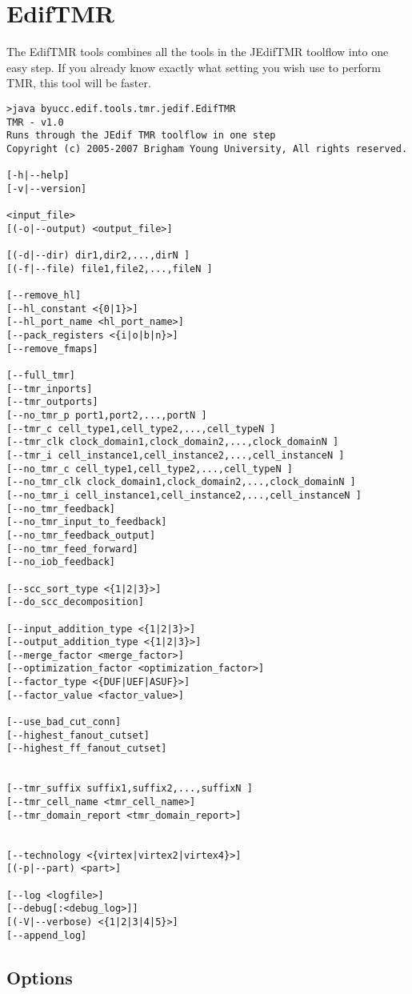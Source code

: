 \section{EdifTMR}
The EdifTMR tools combines all the tools in the JEdifTMR toolflow into
one easy step. If you already know exactly what setting you wish use
to perform TMR, this tool will be faster.

\begin{verbatim}
>java byucc.edif.tools.tmr.jedif.EdifTMR
TMR - v1.0 
Runs through the JEdif TMR toolflow in one step
Copyright (c) 2005-2007 Brigham Young University, All rights reserved.

[-h|--help]
[-v|--version]

<input_file> 
[(-o|--output) <output_file>]

[(-d|--dir) dir1,dir2,...,dirN ]
[(-f|--file) file1,file2,...,fileN ]

[--remove_hl]
[--hl_constant <{0|1}>]
[--hl_port_name <hl_port_name>]
[--pack_registers <{i|o|b|n}>]
[--remove_fmaps]

[--full_tmr]
[--tmr_inports]
[--tmr_outports]
[--no_tmr_p port1,port2,...,portN ]
[--tmr_c cell_type1,cell_type2,...,cell_typeN ]
[--tmr_clk clock_domain1,clock_domain2,...,clock_domainN ]
[--tmr_i cell_instance1,cell_instance2,...,cell_instanceN ]
[--no_tmr_c cell_type1,cell_type2,...,cell_typeN ]
[--no_tmr_clk clock_domain1,clock_domain2,...,clock_domainN ]
[--no_tmr_i cell_instance1,cell_instance2,...,cell_instanceN ]
[--no_tmr_feedback]
[--no_tmr_input_to_feedback]
[--no_tmr_feedback_output]
[--no_tmr_feed_forward]
[--no_iob_feedback]

[--scc_sort_type <{1|2|3}>]
[--do_scc_decomposition]

[--input_addition_type <{1|2|3}>]
[--output_addition_type <{1|2|3}>]
[--merge_factor <merge_factor>]
[--optimization_factor <optimization_factor>]
[--factor_type <{DUF|UEF|ASUF}>]
[--factor_value <factor_value>]

[--use_bad_cut_conn]
[--highest_fanout_cutset]
[--highest_ff_fanout_cutset]


[--tmr_suffix suffix1,suffix2,...,suffixN ]
[--tmr_cell_name <tmr_cell_name>]
[--tmr_domain_report <tmr_domain_report>]


[--technology <{virtex|virtex2|virtex4}>]
[(-p|--part) <part>]

[--log <logfile>]
[--debug[:<debug_log>]]
[(-V|--verbose) <{1|2|3|4|5}>]
[--append_log]

\end{verbatim}
\subsection{Options}


